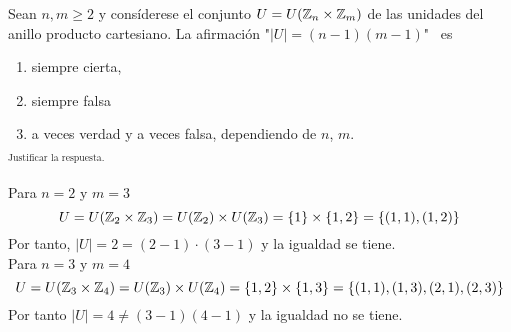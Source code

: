 \documentclass[12pt]{article}
\begin{document}
    \begin{ejercicio}[1.25 puntos]
        Sean $n, m \geq 2$ y consíderese el conjunto $U = U({\mathbb{Z}}_n \times {\mathbb{Z}}_m)$ de las unidades del anillo producto cartesiano. La afirmación "$|U|= (n-1)(m-1)$" \ es
        \begin{enumerate}[label=$\square$]
            \item siempre cierta,
            \item siempre falsa
            \item a veces verdad y a veces falsa, dependiendo de $n$, $m$.
        \end{enumerate}
        $_{\text{Justificar la respuesta.}}$ \\ \\
        Para $n = 2$ y $m = 3$
        \begin{equation*}
            U = U({\mathbb{Z}}_2 \times {\mathbb{Z}}_3) = U({\mathbb{Z}}_2) \times U({\mathbb{Z}}_3) = \{1\} \times \{1, 2\} = \{(1, 1), (1, 2)\}
        \end{equation*}
        Por tanto, $|U| = 2 = (2-1) \cdot (3-1)$ y la igualdad se tiene. \\
        Para $n = 3$ y $m = 4$
        \begin{equation*}
            U = U({\mathbb{Z}}_3 \times {\mathbb{Z}}_4) = U({\mathbb{Z}}_3) \times U({\mathbb{Z}}_4) = \{1, 2\} \times \{1, 3\} = \{(1, 1), (1, 3), (2, 1), (2, 3)\}
        \end{equation*}
        Por tanto $|U| = 4 \neq (3-1)(4-1)$ y la igualdad no se tiene.
    \end{ejercicio}
\end{document}
